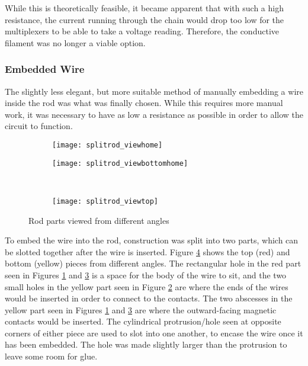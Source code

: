 While this is theoretically feasible, it became apparent that with such a high resistance, the current running through the chain would drop too low for the multiplexers to be able to take a voltage reading. Therefore, the conductive filament was no longer a viable option.


\subsubsection{Embedded Wire}
The slightly less elegant, but more suitable method of manually embedding a wire inside the rod was what was finally chosen. While this requires more manual work, it was necessary to have as low a resistance as possible in order to allow the circuit to  function. 

\begin{figure}[H]
  \begin{subfigure}{.5\linewidth}
    \centering
    \texttt{[image: splitrod\_viewhome]}
    \caption{}
    \label{fig:splitrod_viewhome}
  \end{subfigure}%
  \begin{subfigure}{.5\linewidth}
    \centering
    \texttt{[image: splitrod\_viewbottomhome]}
    \caption{}
    \label{fig:splitrod_viewbottomhome}
  \end{subfigure}\\[1ex]
  \begin{subfigure}{\linewidth}
    \centering
    \texttt{[image: splitrod\_viewtop]}
    \caption{}
    \label{fig:splitrod_viewtop}
  \end{subfigure}
  \caption{Rod parts viewed from different angles}
  \label{fig:splitrod}
\end{figure}


To embed the wire into the rod, construction was split into two parts, which can be slotted together after the wire is inserted. Figure \ref{fig:splitrod} shows the top (red) and bottom (yellow) pieces from different angles. The rectangular hole in the red part seen in Figures \ref{fig:splitrod_viewhome} and \ref{fig:splitrod_viewtop} is a space for the body of the wire to sit, and the two small holes in the yellow part seen in Figure \ref{fig:splitrod_viewbottomhome} are where the ends of the wires would be inserted in order to connect to the contacts. The two abscesses in the yellow part seen in Figures \ref{fig:splitrod_viewhome} and \ref{fig:splitrod_viewtop} are where the outward-facing magnetic contacts would be inserted. The cylindrical protrusion/hole seen at opposite corners of either piece are used to slot into one another, to encase the wire once it has been embedded. The hole was made slightly larger than the protrusion to leave some room for glue. \\


